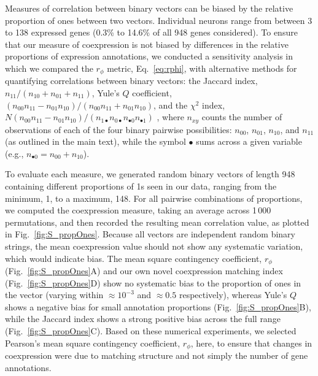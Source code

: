 \documentclass[10pt,letterpaper]{article}
\begin{document}
{Measures of correlation between binary vectors can be biased by the relative proportion of ones between two vectors.
Individual neurons range from between 3 to 138 expressed genes (0.3\% to 14.6\% of all 948 genes considered).
To ensure that our measure of coexpression is not biased by differences in the relative proportions of expression annotations, we conducted a sensitivity analysis in which we compared the $r_\phi$ metric, Eq.~\eqref{eq:rphi}, with alternative methods for quantifying correlations between binary vectors: the
Jaccard index, $n_{11}/(n_{10}+n_{01}+n_{11})$,
Yule's $Q$ coefficient, $(n_{00}n_{11} - n_{01}n_{10})/(n_{00}n_{11} + n_{01}n_{10})$,
and the $\chi^2$ index, $N (n_{00}n_{11} - n_{01}n_{10})/(n_{1\bullet}n_{0\bullet}n_{\bullet 0}n_{\bullet 1})$ \cite{Kaufman2006}, where $n_{xy}$ counts the number of observations of each of the four binary pairwise possibilities: $n_{00}$, $n_{01}$, $n_{10}$, and $n_{11}$ (as outlined in the main text), while the symbol $\bullet$ sums across a given variable (e.g., $n_{\bullet 0} = n_{00} + n_{10}$).

To evaluate each measure, we generated random binary vectors of length 948 containing different proportions of 1s seen in our data, ranging from the minimum, 1, to a maximum, 148.
For all pairwise combinations of proportions, we computed the coexpression measure, taking an average across 1\,000 permutations, and then recorded the resulting mean correlation value, as plotted in Fig.~\ref{fig:S_propOnes}.
Because all vectors are independent random binary strings, the mean coexpression value should not show any systematic variation, which would indicate bias.
The mean square contingency coefficient, $r_\phi$ (Fig.~\ref{fig:S_propOnes}A) and our own novel coexpression matching index (Fig.~\ref{fig:S_propOnes}D) show no systematic bias to the proportion of ones in the vector (varying within $\approx 10^{-3}$ and $\approx 0.5$ respectively), whereas Yule's $Q$ shows a negative bias for small annotation proportions (Fig.~\ref{fig:S_propOnes}B), while the Jaccard index shows a strong positive bias across the full range (Fig.~\ref{fig:S_propOnes}C).
Based on these numerical experiments, we selected Pearson's mean square contingency coefficient, $r_\phi$, here, to ensure that changes in coexpression were due to matching structure and not simply the number of gene annotations.

}
\end{document}
